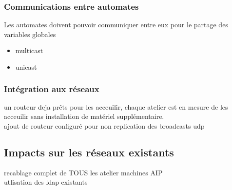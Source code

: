 \documentclass[a4paper]{article}
\begin{document}
\subsubsection{Communications entre automates}
Les automates doivent pouvoir communiquer entre eux pour le partage des variables globales

\begin{itemize}
	\item multicast
	\item unicast
\end{itemize}

\subsubsection{Intégration aux réseaux}
un routeur deja prêts pour les acceuilir, chaque atelier est en mesure de les acceuilir sans installation de matériel supplémentaire.\\
 ajout de routeur configuré pour non replication des broadcasts udp\\


\subsection{Impacts sur les réseaux existants}
recablage complet de TOUS les atelier machines AIP\\
utlisation des ldap existants
\end{document}

